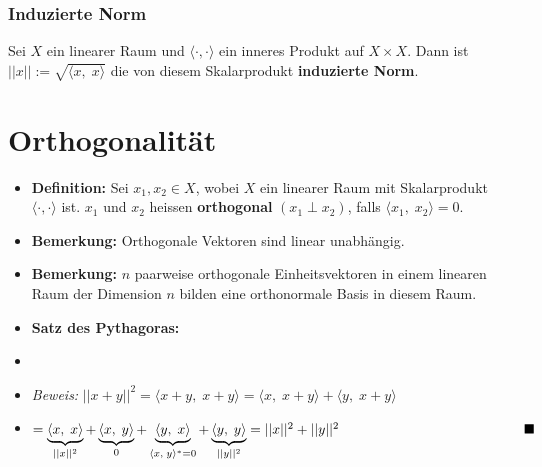 \documentclass[11pt]{article}
\begin{document}
\vspace*{-1cm}
\subsubsection*{Induzierte Norm}
\vspace*{-0.5cm}
Sei $X$ ein linearer Raum und $\langle \cdot, \cdot\rangle$ ein inneres Produkt auf $X \times X$. Dann ist $||x|| := \sqrt{\langle x, \; x\rangle}$ die von diesem Skalarprodukt \textbf{induzierte Norm}.

\pagebreak

\section*{Orthogonalität}
\vspace*{-0.5cm}
\begin{itemize}[leftmargin=0pt]
    \item[] \textbf{Definition:} Sei $x_1, x_2 \in X$, wobei $X$ ein linearer Raum mit Skalarprodukt $\langle \cdot, \cdot \rangle$ ist. $x_1$ und $x_2$ heissen \textbf{orthogonal} $(x_1 \perp x_2)$, falls $\langle x_1, \; x_2\rangle = 0$.
    \item[] \textbf{Bemerkung:} Orthogonale Vektoren sind linear unabhängig.
    \item[] \textbf{Bemerkung:} $n$ paarweise orthogonale Einheitsvektoren in einem linearen Raum der Dimension $n$ bilden eine orthonormale Basis in diesem Raum.
    \item[] \textbf{Satz des Pythagoras:}
    \item[] 
    \item[] \textit{Beweis:} $||x+y||^2 = \langle x + y, \; x + y \rangle = \langle x, \; x + y \rangle + \langle y, \; x + y \rangle $ 
    \item[] \hspace{84pt} $= \underbrace{\langle x, \; x \rangle}_{||x||^2} + \underbrace{\langle x, \; y \rangle}_{0} + \underbrace{\langle y, \; x \rangle}_{\small{\langle x, \; y \rangle^* = 0}} + \underbrace{\langle y, \; y \rangle}_{||y||^2} = ||x||^2 + ||y||^2 \hspace{135pt} \blacksquare$

\end{itemize}
\end{document}
